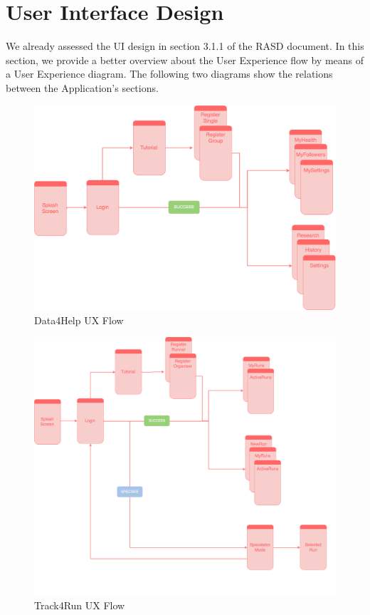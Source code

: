 \documentclass[titlepage]{article}
\begin{document}
\section{User Interface Design}
We already assessed the  UI design in section 3.1.1 of the RASD document. In this section, we provide a better overview about the User Experience flow by means of a User Experience diagram. The following two diagrams show the relations between the Application’s sections.
\begin{figure}[H]
	\center
  	\includegraphics[width=14cm]{UXD4HDiagram.png}
  	\caption{Data4Help UX Flow}
 	\label{fig:D4HUX}
\end{figure}
\begin{figure}[H]
	\center
  	\includegraphics[width=14cm]{UXT4RDiagram.png}
  	\caption{Track4Run UX Flow}
 	\label{fig:T4RUX}
\end{figure}
\pagebreak
\end{document}

